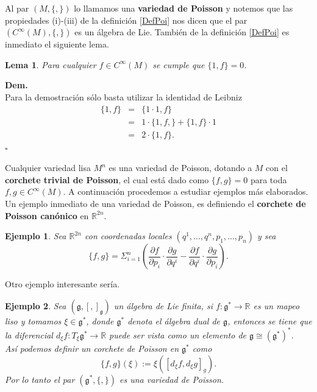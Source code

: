 \documentclass[a4paper,10pt]{book}
\newtheorem{lema}{Lema}[chapter]
\newtheorem{eje}{Ejemplo}[chapter]
\begin{document}
Al par $(M,\{,\})$ lo llamamos una {\bfseries variedad de Poisson} y notemos que las propiedades (i)-(iii) de la definici\'on \ref{DefPoi} nos dicen que el par $(C^{\infty}(M),\{,\})$ es un \'algebra de Lie. Tambi\'en  de la definici\'on \ref{DefPoi} es inmediato el siguiente lema.   

\begin{lema}\label{lema2.2.1}
Para cualquier $f\in C^{\infty}(M)$ se cumple que $\{1,f\}=0$.
\end{lema}
{\bfseries Dem.}\\
Para la demostraci\'on s\'olo basta utilizar la identidad de Leibniz
\begin{eqnarray*}
\{1,f\} & = & \{1\cdot 1,f\}\\
        & = & 1\cdot\{1,f,\}+\{1,f\}\cdot 1\\
        & = & 2\cdot\{1,f\}.  
\end{eqnarray*}
\hfill $\square$

Cualquier variedad lisa $M^{n}$ es una variedad de Poisson, dotando a $M$ con el {\bfseries corchete trivial de Poisson}, el cual est\'a dado como $\{f,g\}=0$ para toda $f,g\in C^{\infty}(M)$. A continuaci\'on procedemos a estudiar ejemplos m\'as elaborados.\\

Un ejemplo inmediato de una variedad de Poisson, es definiendo el {\bfseries corchete de Poisson can\'onico} en $\mathbb{R}^{2n}$.

\begin{eje}\label{eje2.2.1}
Sea $\mathbb{R}^{2n}$ con coordenadas locales $(q^{1},...,q^{n},p_{1},...,p_{n})$ y sea 
\begin{equation}
\{f,g\} = \Sigma_{i=1}^{n} \left( \frac{\partial f}{\partial p_{i}} \cdot \frac{\partial g}{\partial q^{i}}-\frac{\partial f}{\partial q^{i}} \cdot \frac{\partial g}{\partial p_{i}} \right).      
\end{equation}
\end{eje}

Otro ejemplo interesante ser\'ia.

\begin{eje}\label{eje2.2.2}
Sea $(\mathfrak{g},[,]_{\mathfrak{g}})$ un \'algebra de Lie finita, si $f:\mathfrak{g}^{*}\to\mathbb{R}$ es un mapeo liso y tomamos $\xi\in\mathfrak{g}^{*}$, donde $\mathfrak{g}^{*}$ denota el \'algebra dual de $\mathfrak{g}$, entonces se tiene que la diferencial $d_{\xi}f:T_{\xi}\mathfrak{g}^{*}\to\mathbb{R}$ puede ser vista como un elemento de $\mathfrak{g}\cong(\mathfrak{g}^{*})^{*}$.\\

As\'i podemos definir un corchete de Poisson en $\mathfrak{g}^{*}$ como $$\{f,g\}(\xi):=\xi([d_{\xi}f,d_{\xi}g]_{g}).$$
Por lo tanto el par $(\mathfrak{g}^{*},\{,\})$ es una variedad de Poisson.
\end{eje}
\end{document}
